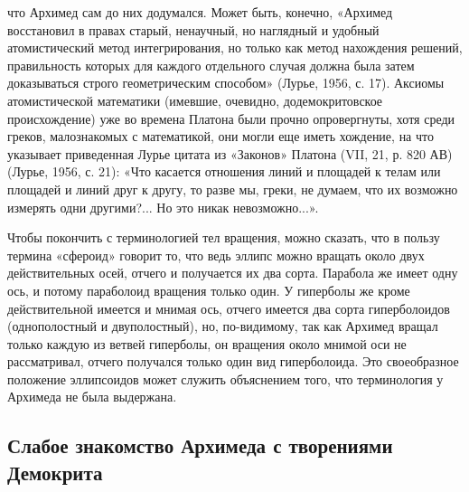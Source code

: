 что Архимед сам до них додумался. Может быть, конечно, «Архимед
восстановил в правах старый, ненаучный, но наглядный и удобный
атомистический метод интегрирования, но только как метод нахождения
решений, правильность которых для каждого отдельного случая должна
была затем доказываться строго геометрическим способом» (Лурье, 1956,
с. 17). Аксиомы атомистической математики (имевшие, очевидно,
додемокритовское происхождение) уже во времена Платона были прочно
опровергнуты, хотя среди греков, малознакомых с математикой, они могли
еще иметь хождение, на что указывает приведенная Лурье цитата из
«Законов» Платона (VII, 21, р. 820 АВ) (Лурье, 1956, с. 21): «Что
касается отношения линий и площадей к телам или площадей и линий друг
к другу, то разве мы, греки, не думаем, что их возможно измерять одни
другими?... Но это никак невозможно...».

Чтобы покончить с терминологией тел вращения, можно сказать, что в
пользу термина «сфероид» говорит то, что ведь эллипс можно вращать
около двух действительных осей, отчего и получается их два сорта.
Парабола же имеет одну ось, и потому параболоид вращения только один.
У гиперболы же кроме действительной имеется и мнимая ось, отчего
имеется два сорта гиперболоидов (однополостный и двуполостный), но,
по-видимому, так как Архимед вращал только каждую из ветвей гиперболы,
он вращения около мнимой оси не рассматривал, отчего получался только
один вид гиперболоида. Это своеобразное положение эллипсоидов может
служить объяснением того, что терминология у Архимеда не была
выдержана.

\subsection{Слабое знакомство Архимеда с творениями Демокрита}

